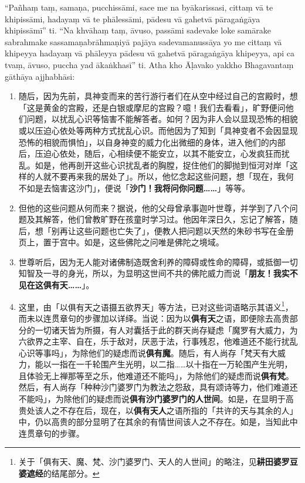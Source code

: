 “Pañhaṃ taṃ, samaṇa, pucchissāmi, sace me na byākarissasi, cittaṃ vā te khipissāmi, hadayaṃ vā te phālessāmi, pādesu vā gahetvā pāragaṅgāya khipissāmī” ti. “Na khvāhaṃ taṃ, āvuso, passāmi sadevake loke samārake sabrahmake sassamaṇabrāhmaṇiyā pajāya sadevamanussāya yo me cittaṃ vā khipeyya hadayaṃ vā phāleyya pādesu vā gahetvā pāragaṅgāya khipeyya, api ca tvaṃ, āvuso, puccha yad ākaṅkhasī” ti. Atha kho Āḷavako yakkho Bhagavantaṃ gāthāya ajjhabhāsi:

\begin{enumerate}\item 随后，因为先前，具神变而来的苦行游行者们在从空中经过自己的宫殿时，想「这是黄金的宫殿，还是白银或摩尼的宫殿？噫！我们去看看」，旷野便问他们问题，以扰乱心识等恼害不能解答者。如何？因为非人会以显现恐怖的相貌或以压迫心依处等两种方式扰乱心识。而他因为了知到「具神变者不会因显现恐怖的相貌而惧怕」，以自身神变的威力化出微细的身体，进入他们的内部后，压迫心依处，随后，心相续便不能安立，以其不能安立，心发疯狂而扰乱。如是，他再剖开这些心识扰乱者的胸膛，捉住他们的脚抛到恒河对岸「这样的人就不要再来我的居处了」。所以，他忆念起这些问题，想「现在，我何不如是去恼害这沙门」，便说「\textbf{沙门！我将问你问题……}」等等。
\item 但他的这些问题从何而来？据说，他的父母曾承事迦叶世尊，并学到了八个问题及其解答，他们曾教旷野在孩童时学习过。他因年深日久，忘记了解答，随后，想「别再让这些问题也亡失了」，便教人把问题以天然的朱砂书写在金册页上，置于宫中。如是，这些佛陀之问唯是佛陀之境域。
\item 世尊听后，因为无人能对诸佛制造既舍利养的障碍或性命的障碍，或抵御一切知智及一寻的身光，所以，为显明这世间不共的佛陀威力而说「\textbf{朋友！我实不见在这俱有天……}」。
\item 这里，由「以俱有天之语摄五欲界天」等方法，已对这些词语略示其语义\footnote{关于「俱有天、魔、梵、沙门婆罗门、天人的人世间」的略注，见\textbf{耕田婆罗豆婆遮经}的结尾部分。}，而未以连贯章句的步骤加以详绎。当说：因为以\textbf{俱有天}之语，即便除去高贵部分的一切诸天皆为所摄，有人对囊括于此的群天尚存疑虑「魔罗有大威力，为六欲界之主宰、自在，乐于敌对，厌恶于法，行事残忍，他难道还不能行扰乱心识等事吗」，为除他们的疑虑而说\textbf{俱有魔}。随后，有人尚存「梵天有大威力，能以一指在一千轮围产生光明，以二指……以十指在一万轮围产生光明，且体验无上禅那等至之乐，他难道还不能吗」，为除他们的疑虑而说\textbf{俱有梵}。然后，有人尚存「种种沙门婆罗门为教法之怨敌，具有颂诗等力，他们难道还不能吗」，为除他们的疑虑而说\textbf{俱有沙门婆罗门的人世间}。如是，在显明于高贵处该人之不存在后，现在，以\textbf{俱有天人}之语所指的「共许的天与其余的人」中，仍以高贵的部分显明了在其余的有情世间该人之不存在。如是，当知此中连贯章句的步骤。

\end{enumerate}
